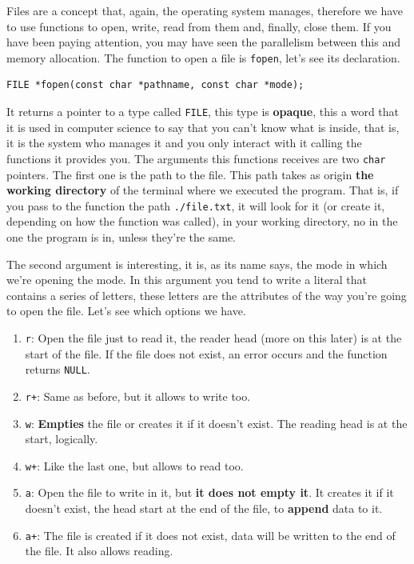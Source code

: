 \documentclass[a4paper]{article}
\begin{document}
Files are a concept that, again, the operating system manages, therefore we have
to use functions to open, write, read from them and, finally, close them. If you
have been paying attention, you may have seen the parallelism between this and
memory allocation. The function to open a file is \lstinline[style=C]!fopen!,
let's see its declaration.

\noindent
\begin{minipage}[H]{\linewidth}
\mbox{}
\begin{lstlisting}[style=C,
caption={\texttt{fopen} function declaration},
label={lst:callocSignature}]
FILE *fopen(const char *pathname, const char *mode);
\end{lstlisting}
\end{minipage}

It returns a pointer to a type called \verb!FILE!, this type is \textbf{opaque},
this a word that it is used in computer science to say that you can't know what
is inside, that is, it is the system who manages it and you only interact with
it calling the functions it provides you. The arguments this functions receives
are two \texttt{char} pointers. The first one is the path to the file. This path
takes as origin \textbf{the working directory} of the terminal where we
executed the program. That is, if you pass to the function the path
\verb!./file.txt!, it will look for it (or create it, depending on how the
function was called), in your working directory, no in the one the program is
in, unless they're the same.

The second argument is interesting, it is, as its name says, the mode in which
we're opening the mode. In this argument you tend to write a literal that
contains a series of letters, these letters are the attributes of the way you're
going to open the file. Let's see which options we have.
\begin{enumerate}
    \item \verb!r!: Open the file just to read it, the reader head (more on this
    later) is at the
    start of the file. If the file does not exist, an error occurs and the
    function returns \verb!NULL!.
    \item \verb!r+!: Same as before, but it allows to write too.
    \item \verb!w!: \textbf{Empties} the file or creates it if it doesn't exist.
    The reading head is at the start, logically.
    \item \verb!w+!: Like the last one, but allows to read too.
    \item \verb!a!: Open the file to write in it, but \textbf{it does not empty
    it}. It creates it if it doesn't exist, the head start at the end of the
    file, to \textbf{append} data to it.
    \item \verb!a+!: The file is created if it does not exist, data will be
    written to the end of the file. It also allows reading.
\end{enumerate}
\end{document}
